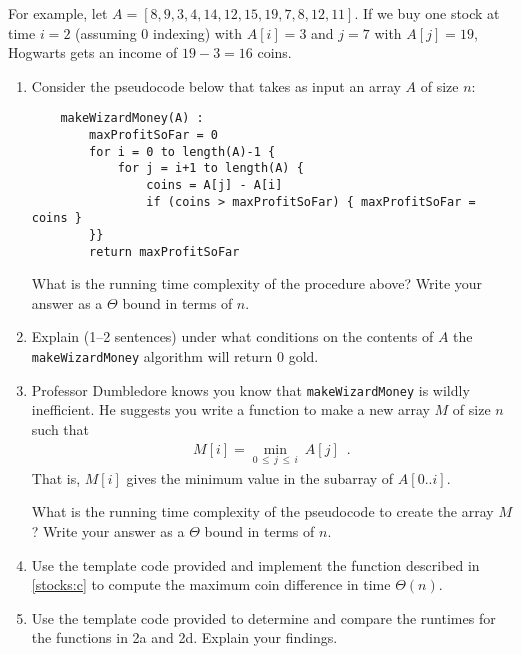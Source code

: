 \documentclass[12pt]{article}
\begin{document}
\begin{enumerate}
	For example, let $A=[8, 9, 3, 4, 14, 12, 15, 19, 7, 8, 12, 11]$. If we buy one stock at time $i=2$ (assuming $0$ indexing) with $A[i]=3$ and $j=7$ with $A[j]=19$, Hogwarts gets an income of $19-3=16$ coins.
	
	\begin{enumerate}
	\item \label{stocks:a} Consider the pseudocode below that takes as input an array $A$ of size $n$:
	\begin{small}
	\begin{verbatim}
	makeWizardMoney(A) : 
	    maxProfitSoFar = 0
	    for i = 0 to length(A)-1 {
	        for j = i+1 to length(A) {
	            coins = A[j] - A[i]
	            if (coins > maxProfitSoFar) { maxProfitSoFar = coins }
	    }}
	    return maxProfitSoFar
	\end{verbatim}
	\end{small}
	What is the running time complexity of the procedure above? Write your answer as a $\Theta$ bound in terms of $n$.
	
	\item \label{stocks:b} Explain (1--2 sentences) under what conditions on the contents of $A$ the {\tt makeWizardMoney} algorithm will return 0 gold.
	
	\item \label{stocks:c} Professor Dumbledore knows you know that {\tt makeWizardMoney} is wildly inefficient. He suggests you write a function to make a new array $M$ of size $n$ such that
	\begin{align}
	M[i] = \min_{0\,\leq\, j\, \leq \,i} ~A[j] \nonumber \enspace .
	\end{align}
	That is, $M[i]$ gives the minimum value in the subarray of $A[0 .. i]$.
	
	What is the running time complexity of the pseudocode to create the array $M$? Write your answer as a $\Theta$ bound in terms of $n$.
	
	\item \label{stocks:d} Use the template code provided and implement the function described in \eqref{stocks:c} to compute the maximum coin difference in time $\Theta(n)$.
	
	\item \label{stocks:e} Use the template code provided to determine and compare the runtimes for the functions in 2a and 2d. Explain your findings.
	
	\end{enumerate}

	\pagebreak


\end{enumerate}
\end{document}
